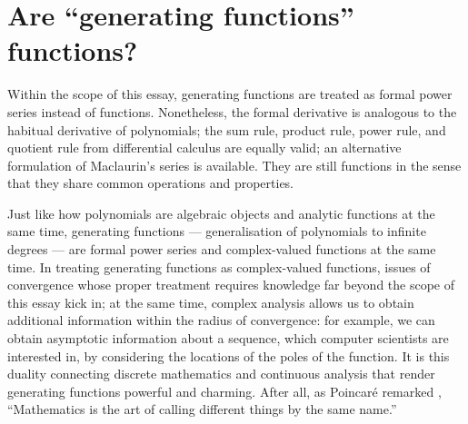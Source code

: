 \documentclass[a4paper, 12pt]{report}
\begin{document}
\section{Are ``generating functions'' functions?}
Within the scope of this essay, generating functions are treated as formal power series instead of functions. Nonetheless, the formal derivative is analogous to the habitual derivative of polynomials; the sum rule, product rule, power rule, and quotient rule from differential calculus are equally valid; an alternative formulation of Maclaurin's series is available. They are still functions in the sense that they share common operations and properties.

Just like how polynomials are algebraic objects and analytic functions at the same time, generating functions --- generalisation of polynomials to infinite degrees --- are formal power series and complex-valued functions at the same time. In treating generating functions as complex-valued functions, issues of convergence whose proper treatment requires knowledge far beyond the scope of this essay kick in; at the same time, complex analysis allows us to obtain additional information within the radius of convergence: for example, we can obtain asymptotic information about a sequence, which computer scientists are interested in, by considering the locations of the poles of the function. It is this duality connecting discrete mathematics and continuous analysis that render generating functions powerful and charming. After all, as Poincaré remarked \autocite[1]{zorich}, ``Mathematics is the art of calling different things by the same name.''


\nocite{*}
\printbibliography
\thispagestyle{empty}
\end{document}
